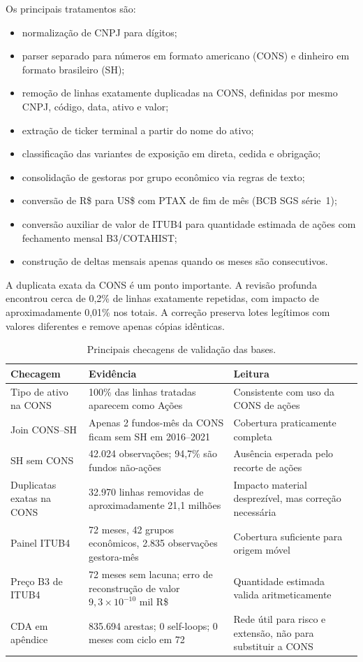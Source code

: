 \documentclass[12pt,a4paper]{report}
\begin{document}
Os principais tratamentos são:
\begin{itemize}
\item normalização de CNPJ para dígitos;
\item parser separado para números em formato americano (CONS) e dinheiro em formato brasileiro (SH);
\item remoção de linhas exatamente duplicadas na CONS, definidas por mesmo CNPJ, código, data, ativo e valor;
\item extração de ticker terminal a partir do nome do ativo;
\item classificação das variantes de exposição em direta, cedida e obrigação;
\item consolidação de gestoras por grupo econômico via regras de texto;
\item conversão de R\$ para US\$ com PTAX de fim de mês (BCB SGS série~1);
\item conversão auxiliar de valor de ITUB4 para quantidade estimada de ações com fechamento mensal B3/COTAHIST;
\item construção de deltas mensais apenas quando os meses são consecutivos.
\end{itemize}

A duplicata exata da CONS é um ponto importante. A revisão profunda encontrou cerca de 0,2\% de linhas
exatamente repetidas, com impacto de aproximadamente 0,01\% nos totais. A correção preserva lotes legítimos
com valores diferentes e remove apenas cópias idênticas.

\begin{table}[H]\centering
\caption{Principais checagens de validação das bases.}
\label{tab:datavalidation}
\scriptsize
\begin{tabular}{p{4.2cm}p{6.2cm}p{3.4cm}}
\toprule
\textbf{Checagem} & \textbf{Evidência} & \textbf{Leitura} \\
\midrule
Tipo de ativo na CONS & 100\% das linhas tratadas aparecem como Ações &
Consistente com uso da CONS de ações \\
Join CONS--SH & Apenas 2 fundos-mês da CONS ficam sem SH em 2016--2021 &
Cobertura praticamente completa \\
SH sem CONS & 42.024 observações; 94,7\% são fundos não-ações &
Ausência esperada pelo recorte de ações \\
Duplicatas exatas na CONS & 32.970 linhas removidas de aproximadamente 21,1 milhões &
Impacto material desprezível, mas correção necessária \\
Painel ITUB4 & 72 meses, 42 grupos econômicos, 2.835 observações gestora-mês &
Cobertura suficiente para origem móvel \\
Preço B3 de ITUB4 & 72 meses sem lacuna; erro de reconstrução de valor $9{,}3\times10^{-10}$ mil R\$ &
Quantidade estimada valida aritmeticamente \\
CDA em apêndice & 835.694 arestas; 0 self-loops; 0 meses com ciclo em 72 &
Rede útil para risco e extensão, não para substituir a CONS \\
\bottomrule
\end{tabular}
\end{table}
\end{document}
